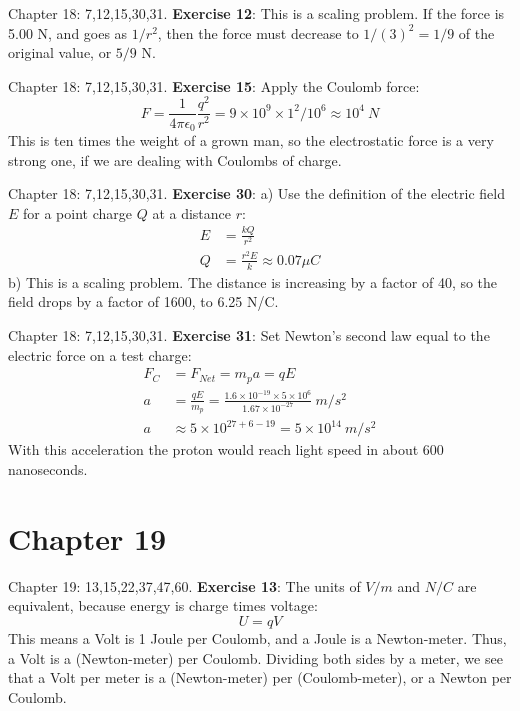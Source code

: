 \documentclass{beamer}
\begin{document}
\begin{frame}{Chapter 18: 7,12,15,30,31.}
\small
\textbf{Exercise 12}: This is a scaling problem.  If the force is 5.00 N, and goes as $1/r^2$, then the force must decrease to $1/(3)^2 = 1/9$ of the original value, or $5/9$ N.
\end{frame}

\begin{frame}{Chapter 18: 7,12,15,30,31.}
\small
\textbf{Exercise 15}: Apply the Coulomb force:
\begin{equation}
F = \frac{1}{4\pi\epsilon_0} \frac{q^2}{r^2} = 9 \times 10^9 \times 1^2 / 10^6 \approx 10^4 ~ N
\end{equation}
This is ten times the weight of a grown man, so the electrostatic force is a very strong one, if we are dealing with Coulombs of charge.
\end{frame}

\begin{frame}{Chapter 18: 7,12,15,30,31.}
\small
\textbf{Exercise 30}: a) Use the definition of the electric field $E$ for a point charge $Q$ at a distance $r$:
\begin{align}
E &= \frac{kQ}{r^2} \\
Q &= \frac{r^2 E}{k} \approx 0.07 \mu C
\end{align}
b) This is a scaling problem.  The distance is increasing by a factor of 40, so the field drops by a factor of 1600, to 6.25 N/C.
\end{frame}

\begin{frame}{Chapter 18: 7,12,15,30,31.}
\small
\textbf{Exercise 31}: Set Newton's second law equal to the electric force on a test charge:
\begin{align}
F_C &= F_{Net} = m_p a = q E \\
a &= \frac{qE}{m_p} = \frac{1.6\times 10^{-19}\times 5\times 10^6}{1.67 \times 10^{-27}} ~ m/s^2 \\
a &\approx 5 \times 10^{27+6-19} = 5 \times 10^{14} ~ m/s^2
\end{align}
With this acceleration the proton would reach light speed in about 600 nanoseconds.
\end{frame}

\section{Chapter 19}

\begin{frame}{Chapter 19: 13,15,22,37,47,60.}
\small
\textbf{Exercise 13}: The units of $V/m$ and $N/C$ are equivalent, because energy is charge times voltage:
\begin{equation}
U = qV
\end{equation}
This means a Volt is 1 Joule per Coulomb, and a Joule is a Newton-meter.  Thus, a Volt is a (Newton-meter) per Coulomb.  Dividing both sides by a meter, we see that a Volt per meter is a (Newton-meter) per (Coulomb-meter), or a Newton per Coulomb.
\end{frame}
\end{document}
